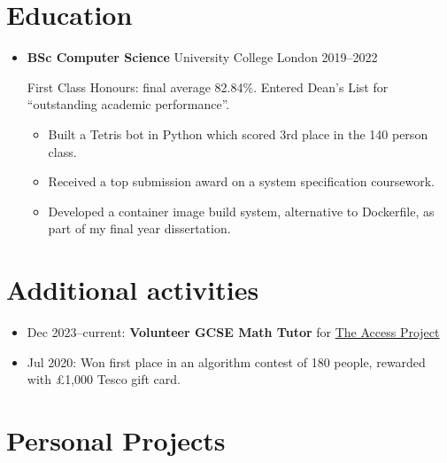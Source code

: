   \section{Education}

  \begin{itemize}
    \item \textbf{BSc Computer Science} \dashdiv{} University College London \dashdiv{} 2019--2022

      First Class Honours: final average 82.84\%. Entered Dean's List for ``outstanding academic performance''.

      \begin{itemize}
        \item Built a Tetris bot in Python which scored 3rd place in the 140 person class.
        \item Received a top submission award on a system specification coursework.

        \item Developed a container image build system, alternative to Dockerfile, as part of my final year dissertation.
      \end{itemize}


  \end{itemize}

  \section{Additional activities}

  \begin{itemize}
    \item Dec 2023--current: \textbf{Volunteer GCSE Math Tutor} for \href{https://www.theaccessproject.org.uk}{\color{link}The Access Project}
    \item Jul 2020: Won first place in an algorithm contest of 180 people, rewarded with £1,000 Tesco gift card.
  \end{itemize}

  \section{Personal Projects}

